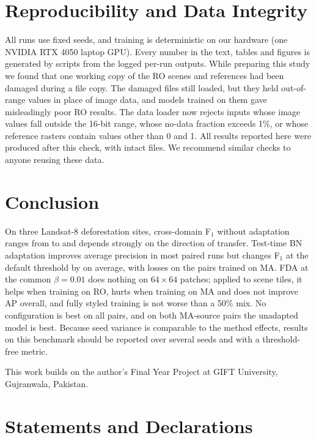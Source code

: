 \documentclass[pdflatex,sn-basic]{sn-jnl}
\newcommand{\Fone}{F$_1$}
\begin{document}
\section{Reproducibility and Data Integrity}\label{sec:repro}

All runs use fixed seeds, and training is deterministic on our hardware (one NVIDIA RTX 4050 laptop GPU).
Every number in the text, tables and figures is generated by scripts from the logged per-run outputs.
While preparing this study we found that one working copy of the RO scenes and references had been damaged during a file copy.
The damaged files still loaded, but they held out-of-range values in place of image data, and models trained on them gave misleadingly poor RO results.
The data loader now rejects inputs whose image values fall outside the 16-bit range, whose no-data fraction exceeds 1\%, or whose reference rasters contain values other than 0 and 1.
All results reported here were produced after this check, with intact files.
We recommend similar checks to anyone reusing these data.

\section{Conclusion}\label{sec:conclusion}

On three Landsat-8 deforestation sites, cross-domain \Fone{} without adaptation ranges from \SOMin{} to \SOMax{} and depends strongly on the direction of transfer.
Test-time BN adaptation improves average precision in most paired runs but changes \Fone{} at the default threshold by \TTAAllD{} on average, with losses on the pairs trained on MA.
FDA at the common $\beta=0.01$ does nothing on $64\times64$ patches; applied to scene tiles, it helps when training on RO, hurts when training on MA and does not improve AP overall, and fully styled training is not worse than a 50\% mix.
No configuration is best on all pairs, and on both MA-source pairs the unadapted model is best.
Because seed variance is comparable to the method effects, results on this benchmark should be reported over several seeds and with a threshold-free metric.


\backmatter

This work builds on the author's Final Year Project at GIFT University, Gujranwala, Pakistan.

\section*{Statements and Declarations}
\end{document}
